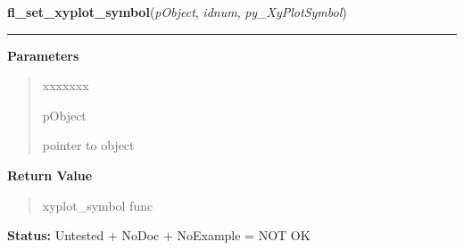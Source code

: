 \hspace{.8\funcindent}\begin{boxedminipage}{\funcwidth}

    \raggedright \textbf{fl\_set\_xyplot\_symbol}(\textit{pObject}, \textit{idnum}, \textit{py\_XyPlotSymbol})

    \vspace{-1.5ex}

    \rule{\textwidth}{0.5\fboxrule}
\setlength{\parskip}{2ex}
\setlength{\parskip}{1ex}
      \textbf{Parameters}
      \vspace{-1ex}

      \begin{quote}
        \begin{Ventry}{xxxxxxx}

          \item[pObject]

          pointer to object

        \end{Ventry}

      \end{quote}

      \textbf{Return Value}
    \vspace{-1ex}

      \begin{quote}
      xyplot\_symbol func

      \end{quote}

\textbf{Status:} Untested + NoDoc + NoExample = NOT OK



    \end{boxedminipage}

    \label{xformslib:library:fl_set_xyplot_mark_active}

    \vspace{0.5ex}

